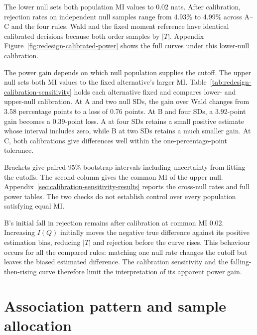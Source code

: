 The lower null sets both population MI values to 0.02 nats. After
calibration, rejection rates on independent null samples range from
4.93\% to 4.99\% across A--C and the four rules. Wald and the fixed
moment reference have identical calibrated decisions because
both order samples by \(|T|\). Appendix Figure~\ref{fig:redesign-calibrated-power}
shows the full curves under this lower-null calibration.



The power gain depends on which null population supplies the cutoff.
The upper null sets both MI values to the fixed alternative's larger MI.
Table~\ref{tab:redesign-calibration-sensitivity} holds each alternative
fixed and compares lower- and upper-null calibration. At A and two null
SDs, the gain over Wald changes from
3.58 percentage points to a loss of 0.76 points. At B and four SDs,
a 3.92-point gain becomes a 0.39-point loss. A at four SDs retains a
small positive estimate whose interval includes zero, while B at two
SDs retains a much smaller gain. At C, both calibrations give differences
well within the one-percentage-point tolerance.

\begin{table}[!htbp]
\centering
\small
\setlength{\tabcolsep}{3pt}
\caption{Expanded Welch minus Wald power under two null calibrations.}
\label{tab:redesign-calibration-sensitivity}

\end{table}

Brackets give paired 95\% bootstrap intervals including uncertainty from
fitting the cutoffs. The second column gives the common MI of the upper
null. \mbox{Appendix~\ref{sec:calibration-sensitivity-results}}
reports the cross-null rates and full power tables. The two checks do
not establish control over every population satisfying equal MI.

B's initial fall in rejection remains after calibration at common MI
0.02. Increasing \(I(Q)\) initially moves the negative true
difference against its positive estimation bias, reducing \(|T|\) and
rejection before the curve rises. This behaviour occurs for all the
compared rules: matching one null rate changes the cutoff but leaves
the biased estimated difference. The calibration sensitivity and the
falling-then-rising curve therefore limit the interpretation of its
apparent power gain.

\section{Association pattern and sample allocation}

